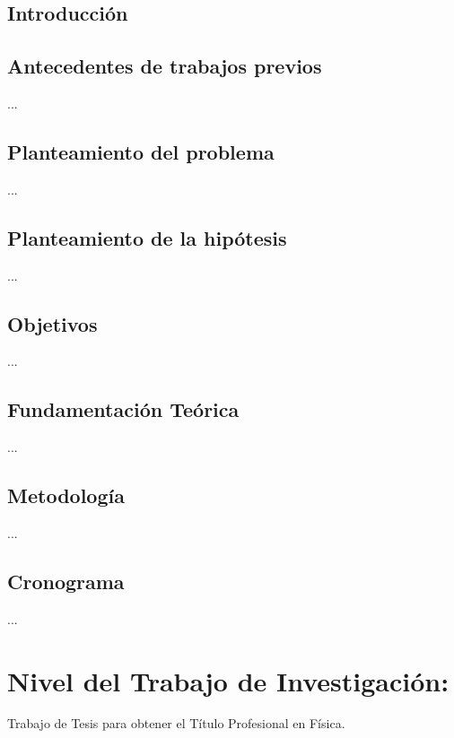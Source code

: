 \documentclass[spanish,a4paper,11pt]{article}
\begin{document}
\subsection{Introducción} 
\subsection*{Antecedentes de trabajos previos}
...

\subsection*{Planteamiento del problema}
...

\subsection*{Planteamiento de la hipótesis}
...

\subsection*{Objetivos} 
...

\subsection{Fundamentación Teórica} 
...

\subsection{Metodología} 
...

\subsection{Cronograma} 
...

\section{Nivel del Trabajo de Investigación:} \noindent 
Trabajo de Tesis para obtener el Título Profesional en Física.  \\
\end{document}
